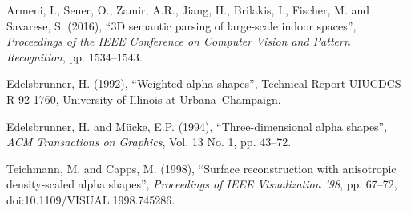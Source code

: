 \documentclass[12pt,a4paper]{article}
\begin{document}
\begin{thebibliography}{}

Armeni, I., Sener, O., Zamir, A.R., Jiang, H., Brilakis, I., Fischer, M. and
Savarese, S. (2016), ``3D semantic parsing of large-scale indoor spaces'',
\emph{Proceedings of the IEEE Conference on Computer Vision and Pattern
Recognition}, pp. 1534--1543.

Edelsbrunner, H. (1992), ``Weighted alpha shapes'', Technical Report
UIUCDCS-R-92-1760, University of Illinois at Urbana--Champaign.

Edelsbrunner, H. and M\"ucke, E.P. (1994), ``Three-dimensional alpha shapes'',
\emph{ACM Transactions on Graphics}, Vol. 13 No. 1, pp. 43--72.

Teichmann, M. and Capps, M. (1998), ``Surface reconstruction with anisotropic
density-scaled alpha shapes'', \emph{Proceedings of IEEE Visualization '98},
pp. 67--72, doi:10.1109/VISUAL.1998.745286.

\end{thebibliography}
\end{document}

